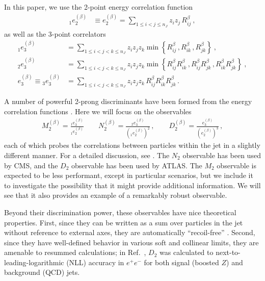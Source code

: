\documentclass[11pt,letterpaper]{article}
\DeclareRobustCommand{\Ref}[1]{Ref.~\cite{#1}}
\newcommand{\ecf}[2]{e_{#1}^{(#2)}}
\newcommand{\ecfvar}[3]{{_{#1}e_{#2}^{(#3)}}}
\newcommand{\Dobs}[2]{D_{#1}^{(#2)}}
\newcommand{\Dobsnobeta}[1]{D_{#1}}
\begin{document}
In this paper, we use the 2-point energy correlation function
\begin{align}\label{eq:explicit_twopointvar}
\ecfvar{1}{2}{\beta}&\equiv\ecf{2}{\beta}=\sum_{1\leq i<j\leq n_J} z_{i}z_{j} \, R_{ij}^\beta\ ,
\end{align}
as well as  the 3-point correlators
\begin{align}\label{eq:explicit_ecfvar}
\ecfvar{1}{3}{\beta}&=\sum_{1\leq i<j<k\leq n_J} z_{i}z_{j}z_{k} \min \left\{ R_{ij}^\beta\,,  R_{ik}^\beta\,, R_{jk}^\beta  \right\} \ , \nonumber \\
\ecfvar{2}{3}{\beta}&=\sum_{1\leq i<j<k\leq n_J} z_{i}z_{j}z_{k} \min \left\{R_{ij}^\beta R_{ik}^\beta\,, R_{ij}^\beta  R_{jk}^\beta\,,     R_{ik}^\beta R_{jk}^\beta    \right\}  \ , \nonumber \\
\ecf{3}{\beta}\equiv\ecfvar{3}{3}{\beta}&=\sum_{1\leq i<j<k\leq n_J} z_{i}z_{j}z_{k} \, R_{ij}^\beta R_{ik}^\beta R_{jk}^\beta \,.
\end{align}






 A number of powerful 2-prong discriminants have been formed from the energy correlation functions  \cite{Larkoski:2013eya,Larkoski:2014gra,Larkoski:2014zma,Moult:2016cvt}. Here we will focus on the observables
\begin{align}
 M_2^{(\beta)} = \frac{\ecfvar{1}{3}{\beta}}{\ecfvar{1}{2}{\beta}} \qquad  N_2^{(\beta)} = \frac{\ecfvar{2}{3}{\beta}}{(\ecfvar{1}{2}{\beta})^2}\,, \qquad  \Dobs{2}{\beta}=\frac{\ecf{3}{\beta}}{(\ecf{2}{\beta})^{3}}\,, 
\end{align}
each of which probes the correlations between particles within the jet in a slightly different manner. For a detailed discussion, see \cite{Moult:2016cvt}. The $N_2$ observable has been used by CMS, and the $D_2$ observable has been used by ATLAS. The $M_2$ observable is expected to be less performant, except in particular scenarios, but we include it to investigate the possibility that it might provide additional information. We will see that it also provides an example of a remarkably robust observable.


Beyond their discrimination power, these observables have nice theoretical properties.  First, since they can be written as a sum over particles in the jet without reference to external axes, they are automatically ``recoil-free'' \cite{Catani:1992jc,Dokshitzer:1998kz,Banfi:2004yd,Larkoski:2013eya,Larkoski:2014uqa}. Second, since they have well-defined behavior in various soft and collinear limits, they are amenable to resummed calculations;  in \Ref{Larkoski:2015kga}, $\Dobsnobeta{2}$ was calculated to next-to-leading-logarithmic (NLL) accuracy in $e^+e^-$ for both signal (boosted $Z$) and background (QCD) jets. 
\end{document}
